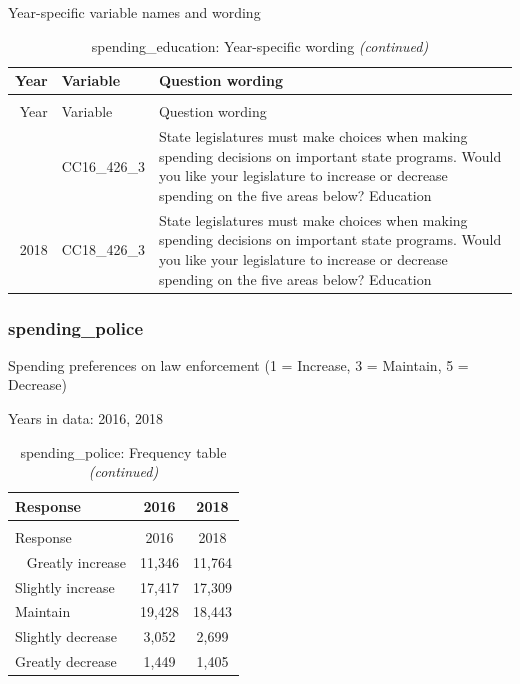\documentclass[12pt]{article}
\begin{document}
\endgroup{}

Year-specific variable names and wording

\begin{longtable}[t]{rl>{\raggedright\arraybackslash}p{10cm}}
\caption{\label{tab:unnamed-chunk-4}spending\_education: Year-specific wording}\\
\toprule
Year & Variable & Question wording\\
\midrule
\endfirsthead
\caption[]{spending\_education: Year-specific wording \textit{(continued)}}\\
\toprule
Year & Variable & Question wording\\
\midrule
\endhead
\
\endfoot
\bottomrule
\endlastfoot
2016 & CC16\_426\_3 & State legislatures must make choices when making spending decisions on important state programs. Would you like your legislature to increase or decrease spending on the five areas below? Education\\
2018 & CC18\_426\_3 & State legislatures must make choices when making spending decisions on important state programs. Would you like your legislature to increase or decrease spending on the five areas below? Education\\*
\end{longtable}

\subsubsection{spending\_police}\label{spending_police}

Spending preferences on law enforcement (1 = Increase, 3 = Maintain, 5 =
Decrease)

Years in data: 2016, 2018\begingroup\fontsize{10}{12}\selectfont

\begin{longtable}[t]{lcc}
\caption{\label{tab:unnamed-chunk-4}spending\_police: Frequency table}\\
\toprule
Response & 2016 & 2018\\
\midrule
\endfirsthead
\caption[]{spending\_police: Frequency table \textit{(continued)}}\\
\toprule
Response & 2016 & 2018\\
\midrule
\endhead
\
\endfoot
\bottomrule
\endlastfoot
Greatly increase & 11,346 & 11,764\\
Slightly increase & 17,417 & 17,309\\
Maintain & 19,428 & 18,443\\
Slightly decrease & 3,052 & 2,699\\
Greatly decrease & 1,449 & 1,405\\*
\end{longtable}
\end{document}
